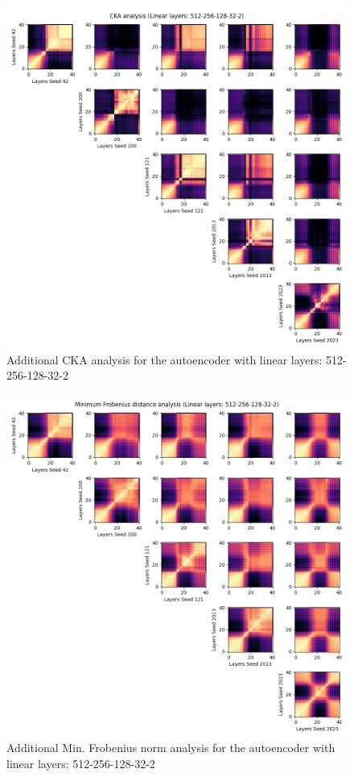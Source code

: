 \documentclass[../main.tex]{subfiles}
\begin{document}
%
\begin{figure}[ht!]
     \centering
    \includegraphics[width=\textwidth]{figures/rs/sim_ae/cka_512-256-128-32-2__42_200_121_2013_2023.png} 
    \caption{Additional CKA analysis for the autoencoder with linear layers: 512-256-128-32-2}
    \label{fig:extra_cka_ae_512_256_128_32_2}
\end{figure}
%
\begin{figure}[ht!]
    \centering
    \includegraphics[width=\textwidth]{figures/rs/sim_ae/frob_512-256-128-32-2__42_200_121_2013_2023.png}
    \caption{Additional Min. Frobenius norm analysis for the autoencoder with linear layers: 512-256-128-32-2}
    \label{fig:extra_frob_ae_512_256_128_32_2}
\end{figure}
\end{document}
